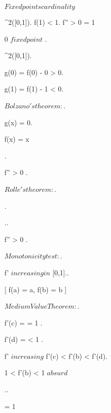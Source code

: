 \documentclass[../Main/main]{subfiles}
\begin{document}
\unit{ $ Fixed points cardinality $ }
{
	{
		{
			 \in \Cc^2([0,1]).
			f(1) < 1.
			f'' > 0 \in [0,1]
		}
		\showthat
		{
			 = 1
		}
		\demonstration
		{
			{
				
				{
					0 $ fixed point $
				}.
				{
					 \in \Cc^2([0,1]).

					g(0) = f(0) - 0 > 0.

					g(1) = f(1) - 1 < 0.

					$Bolzano's theorem: $.

					{
						g(x) = 0.

						f(x) = x
					}
				}


			}.
			
			{
				f'' > 0 \in [0,1].

				$Rolle's theorem:$.

				 .

				 ..



				f'' > 0 \in [0,1].

				$Monotonicity test:$.

				f' $ increasing in $ [0,1]..



				\all{ a < b \in [0,1) }[ f(a) = a, f(b) = b ]
				{
					$Medium Value Theorem:$.

					{
						f'(c) =  = 1
					}.

					{
						f'(d) =  < 1
					}.

					f' $ increasing $ \imp f'(c) < f'(b) < f'(d).

					1 < f'(b) < 1 $ absurd $
				}				 

			}..

			\conclude {} = 1

		}
	}
}
\end{document}
